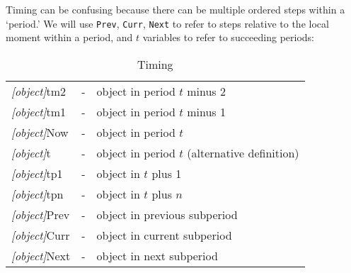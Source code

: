 \documentclass[12pt]{econtex}
\begin{document}
Timing can be confusing because there can be multiple ordered steps 
within a `period.'  We will use \texttt{Prev}, \texttt{Curr}, \texttt{Next} to refer
to steps relative to the local moment within a period, and $t$ variables to refer to succeeding periods:
\begin{table}[h]
	\centering 
	\begin{tabular}{|>{\ttfamily}lcl|} 		
		\hline
   \textit{[object]}tm2 & - & object in period $t$ minus 2 
\\ \textit{[object]}tm1 & - & object in period $t$ minus 1 
\\ \textit{[object]}Now & - & object in period $t$
\\ \textit{[object]}t\phantom{p1}   & - & object in period $t$ (alternative definition)
\\ \textit{[object]}tp1 & - & object in $t$ plus 1 
\\ \textit{[object]}tpn & - & object in $t$ plus $n$ 
\\ \textit{[object]}Prev & - & object in previous subperiod
\\ \textit{[object]}Curr & - & object in current subperiod
\\ \textit{[object]}Next & - & object in next subperiod
\\	\hline
	\end{tabular}
	\caption{Timing}
	\label{table:Timing}
\end{table}	


\end{document}
